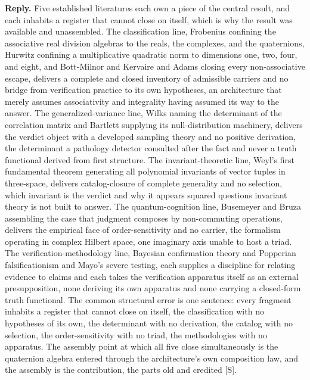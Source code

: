\documentclass[10pt,twocolumn]{article}
\begin{document}
\textbf{Reply.} Five established literatures each own a piece of the
central result, and each inhabits a register that cannot close on
itself, which is why the result was available and unassembled. The
classification line, Frobenius confining the associative real division
algebras to the reals, the complexes, and the quaternions, Hurwitz
confining a multiplicative quadratic norm to dimensions one, two, four,
and eight, and Bott-Milnor and Kervaire and Adams closing every
non-associative escape, delivers a complete and closed inventory of
admissible carriers and no bridge from verification practice to its own
hypotheses, an architecture that merely assumes associativity and
integrality having assumed its way to the answer. The
generalized-variance line, Wilks naming the determinant of the
correlation matrix and Bartlett supplying its null-distribution
machinery, delivers the verdict object with a developed sampling theory
and no positive derivation, the determinant a pathology detector
consulted after the fact and never a truth functional derived from first
structure. The invariant-theoretic line, Weyl's first fundamental
theorem generating all polynomial invariants of vector tuples in
three-space, delivers catalog-closure of complete generality and no
selection, which invariant is the verdict and why it appears squared
questions invariant theory is not built to answer. The quantum-cognition
line, Busemeyer and Bruza assembling the case that judgment composes by
non-commuting operations, delivers the empirical face of
order-sensitivity and no carrier, the formalism operating in complex
Hilbert space, one imaginary axis unable to host a triad. The
verification-methodology line, Bayesian confirmation theory and
Popperian falsificationism and Mayo's severe testing, each supplies a
discipline for relating evidence to claims and each takes the
verification apparatus itself as an external presupposition, none
deriving its own apparatus and none carrying a closed-form truth
functional. The common structural error is one sentence: every fragment
inhabits a register that cannot close on itself, the classification with
no hypotheses of its own, the determinant with no derivation, the
catalog with no selection, the order-sensitivity with no triad, the
methodologies with no apparatus. The assembly point at which all five
close simultaneously is the quaternion algebra entered through the
architecture's own composition law, and the assembly is the
contribution, the parts old and credited {[}S{]}.
\end{document}
